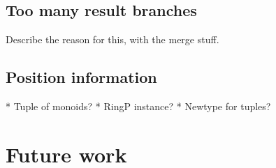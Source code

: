 \documentclass[a4paper,12pt,twosided]{report}
\begin{document}
\subsection{Too many result branches}
Describe the reason for this, with the merge stuff.

\subsection{Position information}
* Tuple of monoids?
* RingP instance?
* Newtype for tuples?

\section{Future work}

%
%



%
%
\end{document}
